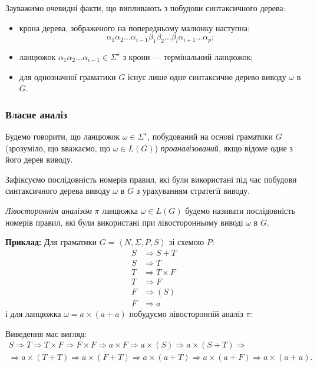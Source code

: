 Зауважимо очевидні факти, що випливають з побудови синтаксичного дерева:
\begin{itemize}
	\item крона дерева, зображеного на попередньому малюнку наступна:
	\begin{equation}
		\alpha_1 \alpha_2 \ldots \alpha_{i - 1} \beta_1 \beta_2 \ldots \beta_l \alpha_{i + 1} \ldots \alpha_p;
	\end{equation}
	\item ланцюжок $\alpha_1 \alpha_2 \ldots \alpha_{i - 1} \in \Sigma^\star$ з крони --- термінальний ланцюжок;
	\item для однозначної граматики $G$ існує лише одне синтаксичне дерево виводу $\omega$ в $G$.
\end{itemize}

\subsubsection{Власне аналіз}

Будемо говорити, що ланцюжок $\omega \in \Sigma^\star$, побудований на основі граматики $G$ (зрозуміло, що вважаємо, що $\omega \in L(G)$) \textit{проаналізований}, якщо відоме одне з його дерев виводу. \medskip

Зафіксуємо послідовність номерів правил, які були використані під час побудови синтаксичного дерева виводу $\omega$ в $G$ з урахуванням стратегії виводу. \medskip

\textit{Лівостороннім аналізом} $\pi$ ланцюжка $\omega \in L(G)$ будемо називати послідовність номерів правил, які були використані при лівосторонньому виводі $\omega$ в $G$. \medskip

\textbf{Приклад:} Для граматики $G = \left\langle N, \Sigma, P, S\right\rangle$ зі схемою $P$:
\begin{align}
	S &\Rightarrow S + T \\
	S &\Rightarrow T \\
	T &\Rightarrow T \times F \\
	T &\Rightarrow F \\
	F &\Rightarrow (S) \\
	F &\Rightarrow a
\end{align}
і для ланцюжка $\omega = a \times (a + a)$ побудуємо лівосторонній аналіз $\pi$: \medskip

Виведення має вигляд:
\begin{multline*}
	S \Rightarrow T \Rightarrow T \times F \Rightarrow F \times F \Rightarrow a \times F \Rightarrow a \times (S) \Rightarrow a \times (S + T) \Rightarrow \\
	\Rightarrow a \times (T + T) \Rightarrow a \times (F + T) \Rightarrow a \times (a + T) \Rightarrow a \times (a + F) \Rightarrow a \times (a + a).
\end{multline*}

